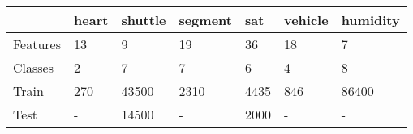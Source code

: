 \begin{tabular}{|l|llllll|}
	\hline
& heart & shuttle & segment & sat & vehicle & humidity \\\hline
Features & 13 & 9 & 19 & 36 & 18 & 7 \\
Classes & 2 & 7 & 7 & 6 & 4 & 8 \\
	Train & 270 & 43500 & 2310 & 4435 & 846 & 86400 \\
	Test & - & 14500 & - & 2000 & - & -\\\hline
\end{tabular}

